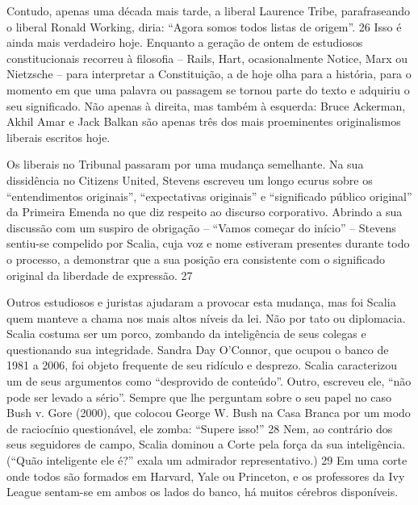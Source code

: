  
\par
 
Contudo, apenas uma década mais tarde, a liberal Laurence Tribe, parafraseando o liberal Ronald Working, diria: “Agora somos todos listas de origem”.
 {\color{blue} 26}  
Isso é ainda mais verdadeiro hoje. Enquanto a geração de ontem de estudiosos constitucionais recorreu à filosofia – Rails, Hart, ocasionalmente Notice, Marx ou Nietzsche – para interpretar a Constituição, a de hoje olha para a história, para o momento em que uma palavra ou passagem se tornou parte do texto e adquiriu o seu significado. Não apenas à direita, mas também à esquerda: Bruce Ackerman, Akhil Amar e Jack Balkan são apenas três dos mais proeminentes originalismos liberais escritos hoje.
 
\par
 
Os liberais no Tribunal passaram por uma mudança semelhante. Na sua dissidência no Citizens United, Stevens escreveu um longo ecurus sobre os “entendimentos originais”, “expectativas originais” e “significado público original” da Primeira Emenda no que diz respeito ao discurso corporativo. Abrindo a sua discussão com um suspiro de obrigação – “Vamos começar do início” – Stevens sentiu-se compelido por Scalia, cuja voz e nome estiveram presentes durante todo o processo, a demonstrar que a sua posição era consistente com o significado original da liberdade de expressão.
 {\color{blue} 27}  

 
\par
 
Outros estudiosos e juristas ajudaram a provocar esta mudança, mas foi Scalia quem manteve a chama nos mais altos níveis da lei. Não por tato ou diplomacia. Scalia costuma ser um porco, zombando da inteligência de seus colegas e questionando sua integridade. Sandra Day O’Connor, que ocupou o banco de 1981 a 2006, foi objeto frequente de seu ridículo e desprezo. Scalia caracterizou um de seus argumentos como “desprovido de conteúdo”. Outro, escreveu ele, “não pode ser levado a sério”. Sempre que lhe perguntam sobre o seu papel no caso Bush v. Gore (2000), que colocou George W. Bush na Casa Branca por um modo de raciocínio questionável, ele zomba: “Supere isso!”
 {\color{blue} 28}  
Nem, ao contrário dos seus seguidores de campo, Scalia dominou a Corte pela força da sua inteligência. (“Quão inteligente ele é?” exala um admirador representativo.)
 {\color{blue} 29}  
Em uma corte onde todos são formados em Harvard, Yale ou Princeton, e os professores da Ivy League sentam-se em ambos os lados do banco, há muitos cérebros disponíveis.
 
